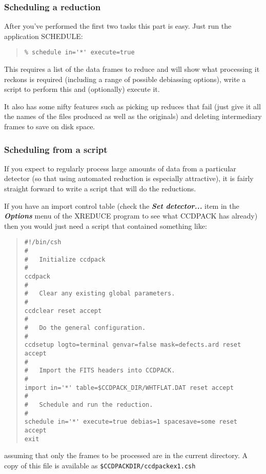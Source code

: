 \documentclass[twoside,11pt]{article}
\newcommand{\htmlref}[2]{#1}
\renewcommand{\_}{\texttt{\symbol{95}}}
\newenvironment{myquote}{\begin{quote}\begin{small}}{\end{small}\end{quote}}
\newcommand{\menu}[1]{{\small \bf \em #1}}
\newcommand{\text}[1]{{\small \tt #1}}
\newcommand{\xroutine}[1]{\htmlref{{\sc #1}}{#1}}
\begin{document}
\subsubsection{Scheduling a reduction}
After you've performed the first two tasks this part is easy. Just run the
application \xroutine{SCHEDULE}:
\begin{myquote}
\begin{verbatim}
% schedule in='*' execute=true
\end{verbatim}
\end{myquote}
This requires a list of the data frames to reduce and will show what
processing it reckons is required (including a range of possible
debiassing options), write a script to perform this and (optionally)
execute it.

It also has some nifty features such as picking up reduces that fail
(just give it all the names of the files produced as well as the
originals) and deleting intermediary frames to save on disk space.

\subsubsection{Scheduling from a script}
If you expect to regularly process large amounts of data from
a particular detector (so that using automated reduction is especially
attractive), it is fairly straight forward to write a script that will
do the reductions.

If you have an import control table (check the
\menu{Set detector...} item in the \menu{Options} menu of the
\xroutine{XREDUCE} program to see what CCDPACK has already)
then you would just need a script that contained something like:

\newpage
\begin{center}
\end{center}
\begin{myquote}
\begin{verbatim}
#!/bin/csh
#
#   Initialize ccdpack
#
ccdpack
#
#   Clear any existing global parameters.
#
ccdclear reset accept
#
#   Do the general configuration.
#
ccdsetup logto=terminal genvar=false mask=defects.ard reset accept
#
#   Import the FITS headers into CCDPACK.
#
import in='*' table=$CCDPACK_DIR/WHTFLAT.DAT reset accept
#
#   Schedule and run the reduction.
#
schedule in='*' execute=true debias=1 spacesave=some reset accept
exit
\end{verbatim}
\end{myquote}
assuming that only the frames to be processed are in the current
directory. A copy of this file is available as
\text{\$CCDPACK\_DIR/ccdpack\_ex1.csh}
\end{document}
